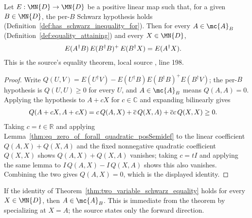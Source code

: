 \begin{theorem}
    \label{thm:two_variable_schwarz_equality}
    \leanok
    Let $E:\MN{D}\to\MN{D}$ be a positive linear map such that, for a
    given $B\in\MN{D}$, the per-$B$ Schwarz hypothesis holds
    (Definition~\ref{def:has_schwarz_inequality_for}). Then for every
    $A\in\mc{A}_B$ (Definition~\ref{def:equality_attaining}) and every
    $X\in\MN{D}$,
    \begin{align}
        E(A^\dagger B)\,E(B^\dagger B)^{+}\,E(B^\dagger X)
         & = E(A^\dagger X).
        \notag
    \end{align}
    This is the source's equality theorem, local source
    , line 198.
\end{theorem}

\begin{proof}\leanok
    Write $Q(U,V) = E(U^\dagger V) - E(U^\dagger B)E(B^\dagger B)^+E(B^\dagger
    V)$; the per-$B$ hypothesis is $Q(U,U)\ge0$ for every $U$, and
    $A\in\mc{A}_B$ means $Q(A,A)=0$. Applying the hypothesis to
    $A + cX$ for $c\in\mathbb C$ and expanding bilinearly gives
    \begin{align}
        Q(A+cX,A+cX)
         & = c\,Q(A,X) + \overline{c}\,Q(X,A) + \overline{c}c\,Q(X,X)
        \ge 0.
        \notag
    \end{align}
    Taking $c=t\in\mathbb R$ and applying
    Lemma~\ref{thm:eq_zero_of_forall_quadratic_posSemidef} to the linear
    coefficient $Q(A,X)+Q(X,A)$ and the fixed nonnegative quadratic
    coefficient $Q(X,X)$ shows $Q(A,X)+Q(X,A)$ vanishes; taking $c=tI$ and
    applying the same lemma to $I\,Q(A,X) - I\,Q(X,A)$ shows this also
    vanishes. Combining the two gives $Q(A,X)=0$, which is the displayed
    identity.
\end{proof}

\begin{corollary}
    \label{cor:two_variable_schwarz_equality_converse}
    \leanok
    If the identity of
    Theorem~\ref{thm:two_variable_schwarz_equality} holds for every
    $X\in\MN{D}$, then $A\in\mc{A}_B$. This is immediate from the
    theorem by specializing at $X=A$; the source states only the forward
    direction.
\end{corollary}
